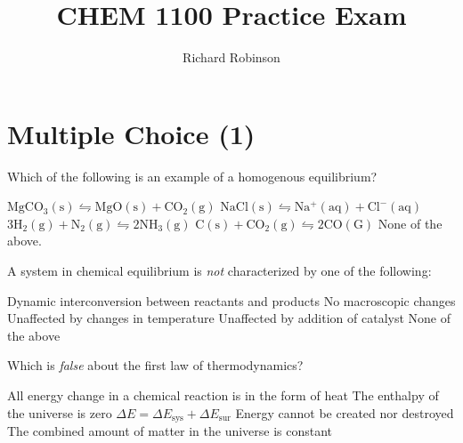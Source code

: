 \documentclass[answers]{exam}
\title{CHEM 1100 Practice Exam}
\author{Richard Robinson}
\begin{document}
\begin{center}
\end{center}
\setlength\columnsep{20pt}


\section{Multiple Choice (1)}
\begin{multicols}{2}
\begin{questions}

\question Which of the following is an example of a homogenous equilibrium?

\begin{choices}
 \choice $\mathrm{MgCO_3(s) \leftrightharpoons MgO(s) + CO_2(g)}$
 \choice $\mathrm{NaCl(s) \leftrightharpoons Na^+(aq) + Cl^-(aq)}$
 \CorrectChoice $\mathrm{3H_2(g) + N_2(g) \leftrightharpoons 2NH_3(g)}$
 \choice $\mathrm{C(s) + CO_2(g) \leftrightharpoons 2CO(G)}$
 \choice None of the above.
\end{choices}

\question A system in chemical equilibrium is \emph{not} characterized by one of the following:

\begin{choices}
  \choice Dynamic interconversion between reactants and products
  \choice No macroscopic changes
  \CorrectChoice Unaffected by changes in temperature
  \choice Unaffected by addition of catalyst
  \choice None of the above
\end{choices}

\question Which is \emph{false} about the first law of thermodynamics?

\begin{choices}
  \CorrectChoice All energy change in a chemical reaction is in the form of heat
  \choice The enthalpy of the universe is zero
  \choice $\Delta E = \Delta E_\text{sys} + \Delta E_{\text{sur}}$
  \choice Energy cannot be created nor destroyed
  \choice The combined amount of matter in the universe is constant
\end{choices}


\end{questions}
\end{multicols}
\end{document}
